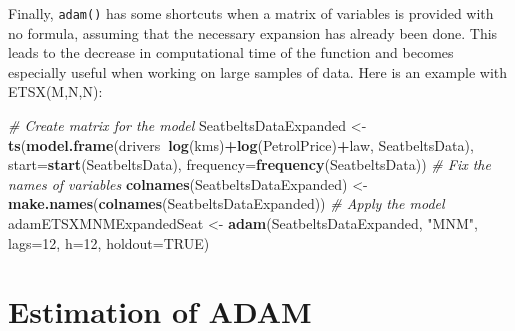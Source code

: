 \documentclass[]{book}
\newenvironment{Shaded}{\begin{snugshade}}{\end{snugshade}}
\newcommand{\CommentTok}[1]{\textcolor[rgb]{0.56,0.35,0.01}{\textit{#1}}}
\newcommand{\DataTypeTok}[1]{\textcolor[rgb]{0.13,0.29,0.53}{#1}}
\newcommand{\DecValTok}[1]{\textcolor[rgb]{0.00,0.00,0.81}{#1}}
\newcommand{\KeywordTok}[1]{\textcolor[rgb]{0.13,0.29,0.53}{\textbf{#1}}}
\newcommand{\NormalTok}[1]{#1}
\newcommand{\OperatorTok}[1]{\textcolor[rgb]{0.81,0.36,0.00}{\textbf{#1}}}
\newcommand{\OtherTok}[1]{\textcolor[rgb]{0.56,0.35,0.01}{#1}}
\newcommand{\StringTok}[1]{\textcolor[rgb]{0.31,0.60,0.02}{#1}}
\theoremstyle{definition}
\theoremstyle{definition}
\theoremstyle{definition}
\theoremstyle{definition}
\theoremstyle{remark}
\begin{document}
Finally, \texttt{adam()} has some shortcuts when a matrix of variables is provided with no formula, assuming that the necessary expansion has already been done. This leads to the decrease in computational time of the function and becomes especially useful when working on large samples of data. Here is an example with ETSX(M,N,N):

\begin{Shaded}
\begin{Highlighting}[]
\CommentTok{# Create matrix for the model}
\NormalTok{SeatbeltsDataExpanded <-}
\StringTok{  }\KeywordTok{ts}\NormalTok{(}\KeywordTok{model.frame}\NormalTok{(drivers}\OperatorTok{~}\KeywordTok{log}\NormalTok{(kms)}\OperatorTok{+}\KeywordTok{log}\NormalTok{(PetrolPrice)}\OperatorTok{+}\NormalTok{law,}
\NormalTok{                 SeatbeltsData),}
     \DataTypeTok{start=}\KeywordTok{start}\NormalTok{(SeatbeltsData), }\DataTypeTok{frequency=}\KeywordTok{frequency}\NormalTok{(SeatbeltsData))}
\CommentTok{# Fix the names of variables}
\KeywordTok{colnames}\NormalTok{(SeatbeltsDataExpanded) <-}
\StringTok{  }\KeywordTok{make.names}\NormalTok{(}\KeywordTok{colnames}\NormalTok{(SeatbeltsDataExpanded))}
\CommentTok{# Apply the model}
\NormalTok{adamETSXMNMExpandedSeat <-}\StringTok{ }\KeywordTok{adam}\NormalTok{(SeatbeltsDataExpanded, }\StringTok{"MNM"}\NormalTok{,}
                                \DataTypeTok{lags=}\DecValTok{12}\NormalTok{, }\DataTypeTok{h=}\DecValTok{12}\NormalTok{, }\DataTypeTok{holdout=}\OtherTok{TRUE}\NormalTok{)}
\end{Highlighting}
\end{Shaded}

\hypertarget{ADAMETSEstimation}{%
\chapter{Estimation of ADAM}\label{ADAMETSEstimation}}
\end{document}
